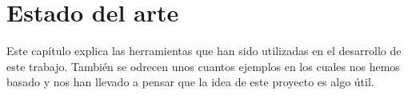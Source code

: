 %
%
%
%
%
%
%
%
%
%

\chapter{Estado del arte}
\label{cap2}

\begin{FraseCelebre}
\begin{Frase}
\end{Frase}
\begin{Fuente}
\end{Fuente}
\end{FraseCelebre}

\begin{resumen}
 Este cap\'itulo explica las herramientas que han sido utilizadas en el desarrollo de este trabajo. Tambi\'en se odrecen unos cuantos ejemplos en los cuales nos hemos basado y nos han llevado a pensar que la idea de este proyecto es algo \'util.
\end{resumen}

